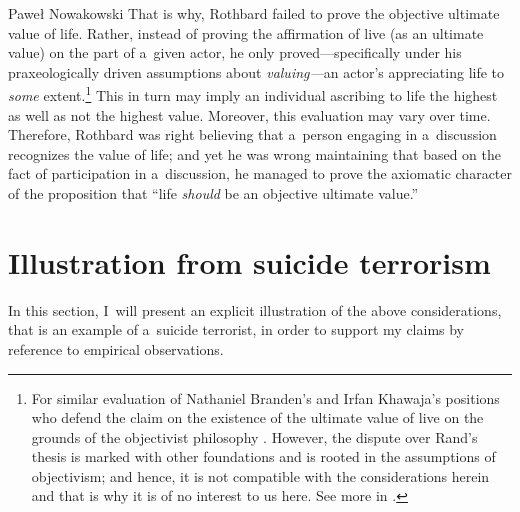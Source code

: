 \begin{artengenv}{Paweł Nowakowski}
That is why, Rothbard failed to prove the objective ultimate value of life. Rather, instead of proving the affirmation of live (as an ultimate value) on the part of a~given actor, he only proved---specifically under his praxeologically driven assumptions about \textit{valuing---}an actor's appreciating life to \textit{some} extent.\footnote{For similar evaluation of Nathaniel Branden's and Irfan Khawaja's positions who defend the claim on the existence of the ultimate value of live on the grounds of the objectivist philosophy 
\parencite[see][pp.97–98]{Moen2012Is}. %
 However, the dispute over Rand's thesis is marked with other foundations and is rooted in the assumptions of objectivism; and hence, it is not compatible with the considerations herein and that is why it is of no interest to us here. See more in 
\parencites[][]{Nozick1971On}[][pp.69–86]{Rasmussen2002Rand}[][pp.54–67]{Hartford2017Ultimate}.%
} This in turn may imply an individual ascribing to life the highest as well as not the highest value. Moreover, this evaluation may vary over time. Therefore, Rothbard was right believing that a~person engaging in a~discussion recognizes the value of life; and yet he was wrong maintaining that based on the fact of participation in a~discussion, he managed to prove the axiomatic character of the proposition that ``life \textit{should} be an objective ultimate value.''



\section{Illustration from suicide terrorism}

In this section, I~will present an explicit illustration of the above considerations, that is an example of a~suicide terrorist, in order to support my claims by reference to empirical observations.




\end{artengenv}
